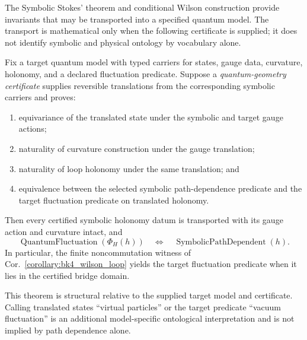 The Symbolic Stokes' theorem and conditional Wilson construction provide invariants that may be transported into a specified quantum model. The transport is mathematical only when the following certificate is supplied; it does not identify symbolic and physical ontology by vocabulary alone.

\begin{proposition}
\label{proposition:bk4_quantum_geometry}
Fix a target quantum model with typed carriers for states, gauge data,
curvature, holonomy, and a declared fluctuation predicate.  Suppose a
\emph{quantum-geometry certificate} supplies reversible translations from the
corresponding symbolic carriers and proves:
\begin{enumerate}
  \item equivariance of the translated state under the symbolic and target
  gauge actions;
  \item naturality of curvature construction under the gauge translation;
  \item naturality of loop holonomy under the same translation; and
  \item equivalence between the selected symbolic path-dependence predicate
  and the target fluctuation predicate on translated holonomy.
\end{enumerate}
Then every certified symbolic holonomy datum is transported with its gauge
action and curvature intact, and
\[
 \operatorname{QuantumFluctuation}(\Phi_H(h))
 \quad\Longleftrightarrow\quad
 \operatorname{SymbolicPathDependent}(h).
\]
In particular, the finite noncommutation witness of
Cor.~\ref{corollary:bk4_wilson_loop} yields the target fluctuation predicate
when it lies in the certified bridge domain.

This theorem is structural relative to the supplied target model and
certificate.  Calling translated states ``virtual particles'' or the target
predicate ``vacuum fluctuation'' is an additional model-specific ontological
interpretation and is not implied by path dependence alone.
\end{proposition}

